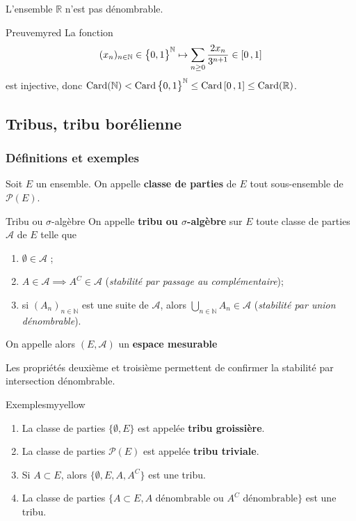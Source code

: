    \begin{theo}{}{}
        L’ensemble $\mathbb{R}$ n’est pas dénombrable.
    \end{theo}

    \begin{demo}{Preuve}{myred}
        La fonction 
        \[ (x_n)_{n \in \mathbb{N}} \in \big\{ 0,1 \big\}^{\mathbb{N}} \mapsto \sum_{n \geq 0} \frac{2 x_n}{3^{n+1}} \in \left[ 0 \, , 1 \right] \]   
        est injective, donc $\operatorname{Card}(\mathbb{N}) < \operatorname{Card}\big\{ 0,1 \big\}^{\mathbb{N}} \leq \operatorname{Card}\left[ 0 \, , 1 \right] \leq \operatorname{Card}(\mathbb{R})$.
    \end{demo}

\subsection{Tribus, tribu borélienne}

    \subsubsection{Définitions et exemples}

    Soit $E$ un ensemble. On appelle \textbf{classe de parties} de $E$ tout sous-ensemble de $\mathcal{P}(E)$.

    \begin{defi}{Tribu ou $\sigma$-algèbre}{}
        On appelle \textbf{tribu ou $\sigma$-algèbre} sur $E$ toute classe de parties $\mathcal{A}$ de $E$ telle que 
        \begin{enumerate}
            \item $\emptyset \in \mathcal{A}$ ;
            \item $A \in \mathcal{A} \implies A^{C} \in \mathcal{A}$ (\textit{stabilité par passage au complémentaire});
            \item si $(A_n)_{n \in \mathbb{N}}$ est une suite de $\mathcal{A}$, alors $\bigcup_{n \in \mathbb{N}} A_n \in \mathcal{A}$ (\textit{stabilité par union dénombrable}).
        \end{enumerate}
        On appelle alors $(E,\mathcal{A})$ un \textbf{espace mesurable}
    \end{defi}

    Les propriétés deuxième et troisième permettent de confirmer la stabilité par intersection dénombrable. 

    \begin{omed}{Exemples}{myyellow}
        \begin{enumerate}[label=\textcolor{myyellow}{\arabic*}]
            \item La classe de parties $\{\emptyset, E\}$ est appelée \textbf{tribu groissière}.
            \item La classe de parties $\mathcal{P}(E)$ est appelée \textbf{tribu triviale}.
            \item Si $A \subset E$, alors $\{ \emptyset, E, A, A^{C} \}$ est une tribu.
            \item La classe de parties $\{ A \subset E, A \text{ dénombrable ou } A^{C} \text{ dénombrable}\}$ est une tribu.
        \end{enumerate}
    \end{omed}

